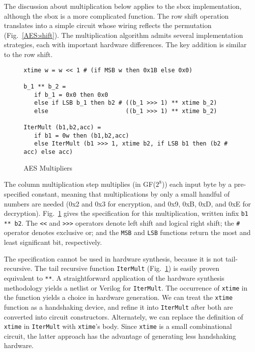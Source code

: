 The discussion about multiplication below applies to the sbox implementation,
although the sbox is a more complicated function.  The row shift operation
translates into a simple circuit whose wiring reflects the permutation
(Fig.~\ref{AES:shift}).  The multiplication algorithm admits several
implementation strategies, each with important hardware
differences.  The key addition is similar to the row shift.

\begin{figure}
\begin{verbatim}
xtime w = w << 1 # (if MSB w then 0x1B else 0x0)

b_1 ** b_2 =
   if b_1 = 0x0 then 0x0
   else if LSB b_1 then b2 # ((b_1 >>> 1) ** xtime b_2)
   else                      ((b_1 >>> 1) ** xtime b_2)

IterMult (b1,b2,acc) =
   if b1 = 0w then (b1,b2,acc)
   else IterMult (b1 >>> 1, xtime b2, if LSB b1 then (b2 # acc) else acc)
\end{verbatim}
\caption{AES Multipliers}
\label{AES:mult}
\end{figure}

The column multiplication step multiplies (in GF($2^8$)) each input byte by a
pre-specified constant, meaning that multiplications by only a small handful
of numbers are needed (0x2 and 0x3 for encryption, and 0x9, 0xB, 0xD, and 0xE
for decryption).  Fig.~\ref{AES:mult} gives the specification for this
multiplication, written infix \verb+b1 ** b2+.  The \verb+<<+ and \verb+>>>+
operators denote left shift and logical right shift; the \verb+#+ operator
denotes exclusive or; and the \verb+MSB+ and \verb+LSB+ functions return the
most and least significant bit, respectively.

The specification cannot be used in hardware synthesis, because it is not
tail-recursive.  The tail recursive function \verb+IterMult+
(Fig.~\ref{AES:mult}) is easily proven equivalent to \verb+**+.  A
straightforward application of the hardware synthesis methodology yields a
netlist or Verilog for \verb+IterMult+.  The occurrence of \verb+xtime+ in the
function yields a choice in hardware generation.  We can treat the \verb+xtime+
function as a handshaking device, and refine it into \verb+IterMult+ after both
are converted into circuit constructors.  Alternately, we can replace the
definition of \verb+xtime+ in \verb+IterMult+ with \verb+xtime+'s body.  Since
\verb+xtime+ is a small combinational circuit, the latter approach has the
advantage of generating less handshaking hardware.

